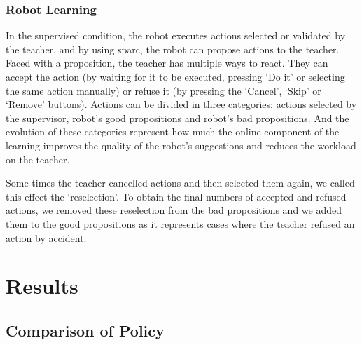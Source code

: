 
\subsubsection{Robot Learning}

In the supervised condition, the robot executes actions selected or validated by the teacher, and by using \gls{sparc}, the robot can propose actions to the teacher. Faced with a proposition, the teacher has multiple ways to react. They can accept the action (by waiting for it to be executed, pressing `Do it' or selecting the same action manually) or refuse it (by pressing the `Cancel', `Skip' or `Remove' buttons). Actions can be divided in three categories: actions selected by the supervisor, robot's good propositions and robot's bad propositions. And the evolution of these categories represent how much the online component of the learning improves the quality of the robot's suggestions and reduces the workload on the teacher. 

Some times the teacher cancelled actions and then selected them again, we called this effect the `reselection'. To obtain the final numbers of accepted and refused actions, we removed these reselection from the bad propositions and we added them to the good propositions as it represents cases where the teacher refused an action by accident.

\section{Results}



\subsection{Comparison of Policy}

